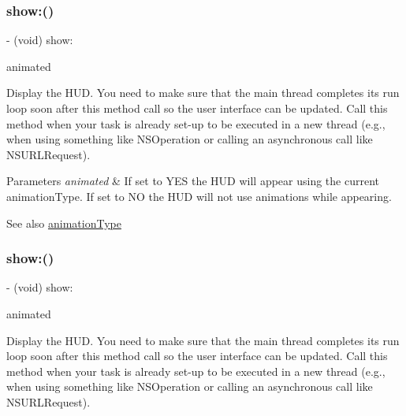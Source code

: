 \subsubsection{\texorpdfstring{show\+:()}{show:()}\hspace{0.1cm}{\footnotesize\ttfamily [2/3]}}
{\footnotesize\ttfamily -\/ (void) show\+: \begin{DoxyParamCaption}\item[{(B\+O\+OL)}]{animated }\end{DoxyParamCaption}}

Display the H\+UD. You need to make sure that the main thread completes its run loop soon after this method call so the user interface can be updated. Call this method when your task is already set-\/up to be executed in a new thread (e.\+g., when using something like N\+S\+Operation or calling an asynchronous call like N\+S\+U\+R\+L\+Request).


\begin{DoxyParams}{Parameters}
{\em animated} & If set to Y\+ES the H\+UD will appear using the current animation\+Type. If set to NO the H\+UD will not use animations while appearing.\\
\hline
\end{DoxyParams}
\begin{DoxySeeAlso}{See also}
\mbox{\hyperlink{interface_m_b_progress_h_u_d_a71d04bb9e2839df9377ad10d03b2e468}{animation\+Type}} 
\end{DoxySeeAlso}
\mbox{\label{interface_m_b_progress_h_u_d_a3ef075a3be624c2f94629d63bfeae25b}} 
\subsubsection{\texorpdfstring{show\+:()}{show:()}\hspace{0.1cm}{\footnotesize\ttfamily [3/3]}}
{\footnotesize\ttfamily -\/ (void) show\+: \begin{DoxyParamCaption}\item[{(B\+O\+OL)}]{animated }\end{DoxyParamCaption}}

Display the H\+UD. You need to make sure that the main thread completes its run loop soon after this method call so the user interface can be updated. Call this method when your task is already set-\/up to be executed in a new thread (e.\+g., when using something like N\+S\+Operation or calling an asynchronous call like N\+S\+U\+R\+L\+Request).


